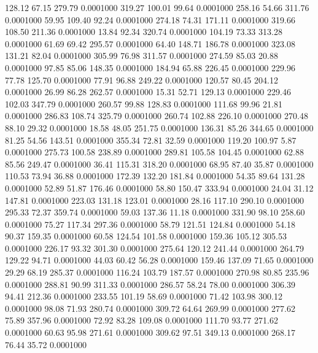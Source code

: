  128.12   67.15  279.79   0.0001000
 319.27  100.01   99.64   0.0001000
 258.16   54.66  311.76   0.0001000
  59.95  109.40   92.24   0.0001000
 274.18   74.31  171.11   0.0001000
 319.66  108.50  211.36   0.0001000
  13.84   92.34  320.74   0.0001000
 104.19   73.33  313.28   0.0001000
  61.69   69.42  295.57   0.0001000
  64.40  148.71  186.78   0.0001000
 323.08  131.21   82.04   0.0001000
 305.99   76.98  311.57   0.0001000
 274.59   85.03   20.88   0.0001000
  97.85   85.06  148.35   0.0001000
 184.94   65.88  226.45   0.0001000
 229.96   77.78  125.70   0.0001000
  77.91   96.88  249.22   0.0001000
 120.57   80.45  204.12   0.0001000
  26.99   86.28  262.57   0.0001000
  15.31   52.71  129.13   0.0001000
 229.46  102.03  347.79   0.0001000
 260.57   99.88  128.83   0.0001000
 111.68   99.96   21.81   0.0001000
 286.83  108.74  325.79   0.0001000
 260.74  102.88  226.10   0.0001000
 270.48   88.10   29.32   0.0001000
  18.58   48.05  251.75   0.0001000
 136.31   85.26  344.65   0.0001000
  81.25   54.56  143.51   0.0001000
 355.34   72.81   32.59   0.0001000
 119.20  100.97    5.87   0.0001000
 275.73  100.58  238.89   0.0001000
 289.81  105.58  104.45   0.0001000
  62.88   85.56  249.47   0.0001000
  36.41  115.31  318.20   0.0001000
  68.95   87.40   35.87   0.0001000
 110.53   73.94   36.88   0.0001000
 172.39  132.20  181.84   0.0001000
  54.35   89.64  131.28   0.0001000
  52.89   51.87  176.46   0.0001000
  58.80  150.47  333.94   0.0001000
  24.04   31.12  147.81   0.0001000
 223.03  131.18  123.01   0.0001000
  28.16  117.10  290.10   0.0001000
 295.33   72.37  359.74   0.0001000
  59.03  137.36   11.18   0.0001000
 331.90   98.10  258.60   0.0001000
  75.27  117.34  297.36   0.0001000
  58.79  121.51  124.84   0.0001000
  54.18   90.37  159.35   0.0001000
  60.58  124.54  101.58   0.0001000
 159.36  105.12  305.53   0.0001000
 226.17   93.32  301.30   0.0001000
 275.64  120.12  241.44   0.0001000
 264.79  129.22   94.71   0.0001000
  44.03   60.42   56.28   0.0001000
 159.46  137.09   71.65   0.0001000
  29.29   68.19  285.37   0.0001000
 116.24  103.79  187.57   0.0001000
 270.98   80.85  235.96   0.0001000
 288.81   90.99  311.33   0.0001000
 286.57   58.24   78.00   0.0001000
 306.39   94.41  212.36   0.0001000
 233.55  101.19   58.69   0.0001000
  71.42  103.98  300.12   0.0001000
  98.08   71.93  280.74   0.0001000
 309.72   64.64  269.99   0.0001000
 277.62   75.89  357.96   0.0001000
  72.92   83.28  109.08   0.0001000
 111.70   93.77  271.62   0.0001000
  60.63   95.98  271.61   0.0001000
 309.62   97.51  349.13   0.0001000
 268.17   76.44   35.72   0.0001000
